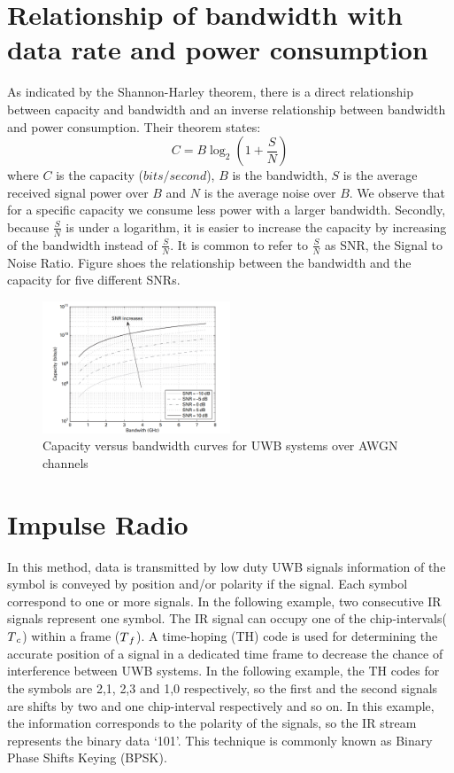\documentclass[\main/main.tex]{subfiles}
\begin{document}
\section{Relationship of bandwidth with data rate and power consumption}
As indicated by the Shannon-Harley theorem, there is a direct relationship between capacity and bandwidth and an inverse relationship between bandwidth and power consumption. Their theorem states: 
\begin{equation}
    C=B\log_2(1+\frac{S}{N})
\end{equation} where $C$ is the capacity ($bits/second$), $B$ is the bandwidth, $S$ is the average received signal power over $B$ and $N$ is the average noise over $B$. We observe that for a specific capacity we consume less power with a larger bandwidth. Secondly, because $\frac{S}{N}$ is under a logarithm, it is easier to increase the capacity by increasing of the bandwidth instead of $\frac{S}{N}$. It is common to refer to $\frac{S}{N}$ as SNR, the Signal to Noise Ratio. Figure shoes the relationship between the bandwidth and the capacity for five different SNRs.

\begin{figure}[H]
    \centering
    \includegraphics[width=0.5\textwidth]{capacity_versus_bandwidth_curves_for_uwb_systems_over_awgn_channels}
    \caption{Capacity versus bandwidth curves for UWB systems over AWGN channels}
    \label{fig:capacity_versus_bandwidth_curves_for_uwb_systems_over_awgn_channels}
\end{figure}

\section{Impulse Radio}
In this method, data is transmitted by low duty UWB signals information of the symbol is conveyed by position and/or polarity if the signal. Each symbol correspond to one or more signals. In the following example, two consecutive IR signals represent one symbol. The IR signal can occupy one of the chip-intervals($T\textsubscript{$c$}$) within a frame ($T\textsubscript{$f$}$). A time-hoping (TH) code is used for determining the accurate position of a signal in a dedicated time frame to decrease the chance of interference between UWB systems. In the following example, the TH codes for the symbols are {2,1}, {2,3} and {1,0} respectively, so the first and the second signals are shifts by two and one chip-interval respectively and so on. In this example, the information corresponds to the polarity of the signals, so the IR stream represents the binary data `101'. This technique is commonly known as Binary Phase Shifts Keying (BPSK).
\end{document}
